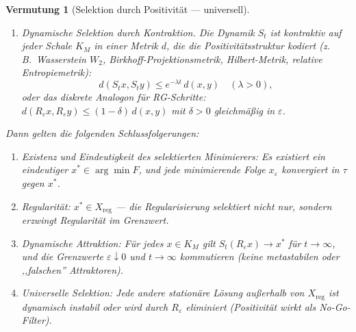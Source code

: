 \documentclass[12pt,a4paper]{article}
\newtheorem{conjecture}[theorem]{Vermutung}
\theoremstyle{definition}
\theoremstyle{remark}
\begin{document}
\begin{conjecture}[Selektion durch Positivit\"at --- universell]
\begin{enumerate}
\item[\textup{(SP4)}] \emph{Dynamische Selektion durch Kontraktion.}
Die Dynamik $S_t$ ist kontraktiv auf jeder Schale $K_M$ in einer Metrik $d$, die die Positivit\"atsstruktur kodiert (z.\,B.\ Wasserstein $W_2$, Birkhoff-Projektionsmetrik, Hilbert-Metrik, relative Entropiemetrik):
\[
d(S_t x, S_t y) \leq e^{-\lambda t} \, d(x, y) \quad (\lambda > 0),
\]
oder das diskrete Analogon f\"ur RG-Schritte: $d(R_\varepsilon x, R_\varepsilon y) \leq (1-\delta) \, d(x,y)$ mit $\delta > 0$ gleichm\"a\ss ig in $\varepsilon$.
\end{enumerate}

Dann gelten die folgenden Schlussfolgerungen:
\begin{enumerate}
\item[\textup{(C1)}] \emph{Existenz und Eindeutigkeit des selektierten Minimierers:} Es existiert ein eindeutiger $x^* \in \arg\min F$, und jede minimierende Folge $x_\varepsilon$ konvergiert in $\tau$ gegen $x^*$.

\item[\textup{(C2)}] \emph{Regularit\"at:} $x^* \in X_{\mathrm{reg}}$ --- die Regularisierung selektiert nicht nur, sondern \emph{erzwingt} Regularit\"at im Grenzwert.

\item[\textup{(C3)}] \emph{Dynamische Attraktion:} F\"ur jedes $x \in K_M$ gilt $S_t(R_\varepsilon x) \to x^*$ f\"ur $t \to \infty$, und die Grenzwerte $\varepsilon \downarrow 0$ und $t \to \infty$ kommutieren (keine metastabilen oder ,,falschen'' Attraktoren).

\item[\textup{(C4)}] \emph{Universelle Selektion:} Jede andere station\"are L\"osung au\ss erhalb von $X_{\mathrm{reg}}$ ist dynamisch instabil oder wird durch $R_\varepsilon$ eliminiert (Positivit\"at wirkt als No-Go-Filter).
\end{enumerate}
\end{conjecture}
\end{document}
